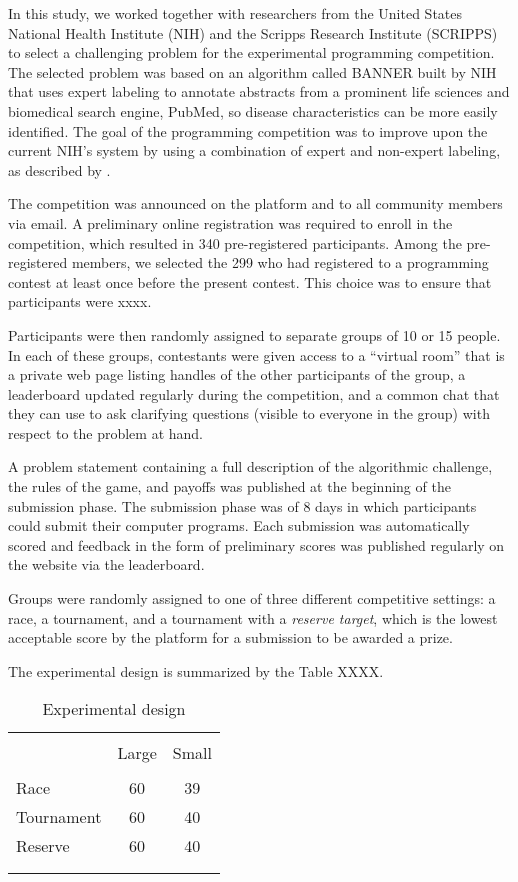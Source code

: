 \documentclass[12pt,]{article}
\begin{document}
In this study, we worked together with researchers from the United
States National Health Institute (NIH) and the Scripps Research
Institute (SCRIPPS) to select a challenging problem for the experimental
programming competition. The selected problem was based on an algorithm
called BANNER built by NIH \citep{leaman2008banner} that uses expert
labeling to annotate abstracts from a prominent life sciences and
biomedical search engine, PubMed, so disease characteristics can be more
easily identified. The goal of the programming competition was to
improve upon the current NIH's system by using a combination of expert
and non-expert labeling, as described by \citet{good2014microtask}.

The competition was announced on the platform and to all community
members via email. A preliminary online registration was required to
enroll in the competition, which resulted in 340 pre-registered
participants. Among the pre-registered members, we selected the 299 who
had registered to a programming contest at least once before the present
contest. This choice was to ensure that participants were xxxx.

Participants were then randomly assigned to separate groups of 10 or 15
people. In each of these groups, contestants were given access to a
``virtual room'' that is a private web page listing handles of the other
participants of the group, a leaderboard updated regularly during the
competition, and a common chat that they can use to ask clarifying
questions (visible to everyone in the group) with respect to the problem
at hand.

A problem statement containing a full description of the algorithmic
challenge, the rules of the game, and payoffs was published at the
beginning of the submission phase. The submission phase was of 8 days in
which participants could submit their computer programs. Each submission
was automatically scored and feedback in the form of preliminary scores
was published regularly on the website via the leaderboard.

Groups were randomly assigned to one of three different competitive
settings: a race, a tournament, and a tournament with a \emph{reserve
target}, which is the lowest acceptable score by the platform for a
submission to be awarded a prize.

The experimental design is summarized by the Table XXXX.

\begin{table}
\centering
\caption{Experimental design}
\label{tab: experimental design}
\begin{tabular}{@{}lcc}
  \\[-1.8ex]\hline \hline \\[-1.8ex]
 & Large & Small \\ 
  \hline \\[-1.86ex]
Race & 60 & 39 \\ 
  Tournament & 60 & 40 \\ 
  Reserve & 60 & 40 \\ 
   \\[-1.8ex]\hline \hline \\[-1.8ex]
\end{tabular}
\end{table}
\end{document}

